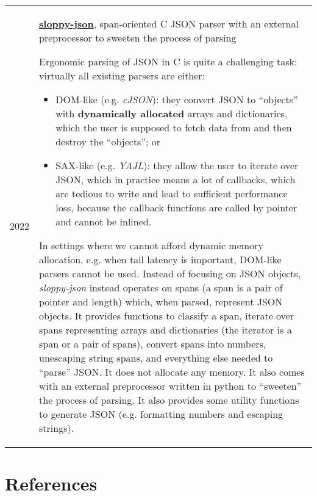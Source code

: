 \documentclass[10pt]{article}
\begin{document}
\begin{tabularx}{\textwidth}{ l X }
    2022 & \href{https://github.com/shdown/sloppy-json}{\textbf{sloppy-json}}, span-oriented C JSON parser with an external preprocessor to sweeten the process of parsing
    \newline
    \footnotesize{
        Ergonomic parsing of JSON in C is quite a challenging task: virtually all existing parsers are either:
        \begin{itemize}
            \item DOM-like (e.g. \textit{cJSON}): they convert JSON to ``objects'' with \textbf{dynamically allocated} arrays and dictionaries, which the user is supposed to fetch data from and then destroy the ``objects''; or
            \item SAX-like (e.g. \textit{YAJL}): they allow the user to iterate over JSON, which in practice means a lot of callbacks, which are tedious to write and lead to sufficient performance loss, because the callback functions are called by pointer and cannot be inlined.
        \end{itemize}
        In settings where we cannot afford dynamic memory allocation, e.g. when tail latency is important, DOM-like parsers cannot be used.
        Instead of focusing on JSON objects, \textit{sloppy-json} instead operates on spans (a span is a pair of pointer and length) which, when parsed, represent JSON objects.
        It provides functions to classify a span, iterate over spans representing arrays and dictionaries (the iterator is a span or a pair of spans), convert spans into numbers, unescaping string spans, and everything else needed to ``parse'' JSON.
        It does not allocate any memory.
        It also comes with an external preprocessor written in python to ``sweeten'' the process of parsing.
        It also provides some utility functions to generate JSON (e.g. formatting numbers and escaping strings).
    }
    \\
\end{tabularx}

\medskip

\section{References}
\end{document}

